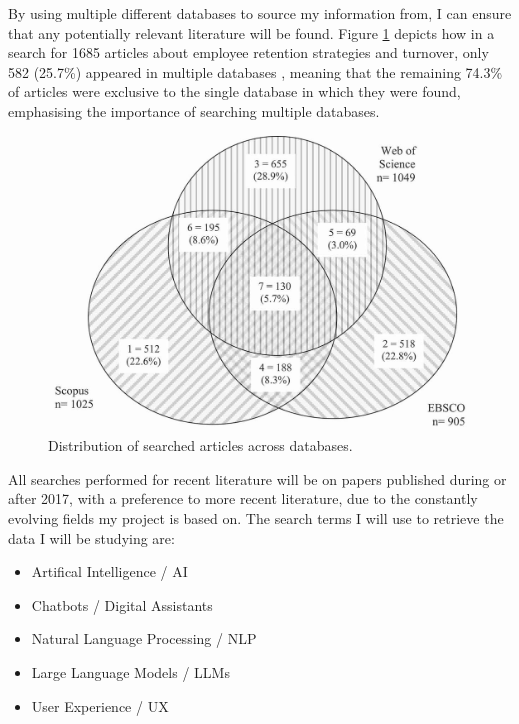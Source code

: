 \documentclass[12pt]{report}
\begin{document}
    \noindent By using multiple different databases to source my information from, I can ensure that
    any potentially relevant literature will be found. Figure \ref{fig:litSearch} depicts 
    how in a search for 1685 articles about employee retention strategies and turnover, only 582 (25.7\%) appeared in multiple databases
    \autocite{litSearch}, meaning that the remaining 74.3\% of articles were exclusive to the single 
    database in which they were found, emphasising the importance of searching multiple databases.  

    \begin{figure}[H]
        \centering
        \includegraphics[width=.6\linewidth]{litSearchDBs.jpg}
        \caption{Distribution of searched articles across databases. \autocite{litSearch}}
        \label{fig:litSearch}
    \end{figure}
   
    \noindent 
    All searches performed for recent literature will be on papers published during or after 2017, with a preference 
    to more recent literature, due to the constantly evolving fields my project is based on. 
    The search terms I will use to retrieve the data I will be studying are:

    \begin{itemize}
        \item Artifical Intelligence / AI 
        \item Chatbots / Digital Assistants
        \item Natural Language Processing / NLP
        \item Large Language Models / LLMs
        \item User Experience / UX
    \end{itemize}
\end{document}
